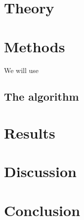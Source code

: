 \documentclass[english,notitlepage,reprint,nofootinbib]{revtex4-2}  %
\begin{document}
	\section{Theory}\label{sec:theory}
	\section{Methods}\label{sec:methods}
	We will use

	
	\subsection*{The algorithm}\label{sec:algorithm}

	\section{Results}\label{sec:results}

	
	
	\section{Discussion}\label{sec:discussion}

	
	\section{Conclusion}\label{sec:conclusion}

	\onecolumngrid
	
	
	
	
\end{document}
